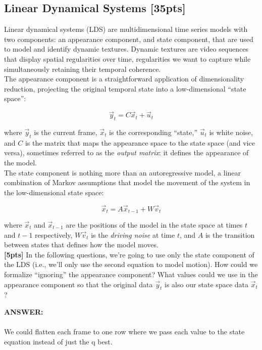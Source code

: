 \documentclass[paper=a4, fontsize=11pt]{scrartcl} %
\numberwithin{figure}{section} %
\numberwithin{table}{section} %
\begin{document}
\subsection{Linear Dynamical Systems \textbf{[35pts]}}

Linear dynamical systems (LDS) are multidimensional time series models with two components: an appearance component, and state component, that are used to model and identify dynamic textures. Dynamic textures are video sequences that display spatial regularities over time, regularities we want to capture while simultaneously retaining their temporal coherence. \\

The appearance component is a straightforward application of dimensionality reduction, projecting the original temporal state into a low-dimensional ``state space'':

$$
\vec{y}_t = C\vec{x}_t + \vec{u}_t
$$

where $\vec{y}_t$ is the current frame, $\vec{x}_t$ is the corresponding ``state,'' $\vec{u}_t$ is white noise, and $C$ is the matrix that maps the appearance space to the state space (and vice versa), sometimes referred to as the \emph{output matrix}: it defines the appearance of the model. \\

The state component is nothing more than an autoregressive model, a linear combination of Markov assumptions that model the movement of the system in the low-dimensional state space:

$$
\vec{x}_t = A\vec{x}_{t - 1} + W\vec{v}_t
$$

where $\vec{x}_t$ and $\vec{x}_{t - 1}$ are the positions of the model in the state space at times $t$ and $t - 1$ respectively, $W\vec{v}_t$ is the \emph{driving noise} at time $t$, and $A$ is the transition between states that defines how the model moves. \\

\textbf{[5pts]} In the following questions, we're going to use only the state component of the LDS (i.e., we'll only use the second equation to model motion). How could we formalize ``ignoring'' the appearance component? What values could we use in the appearance component so that the original data $\vec{y}_t$ is also our state space data $\vec{x}_t$? \\

\begin{addmargin}[2em]{2em}%
  \textbf{ANSWER:}\\\\
  We could flatten each frame to one row where we pass each value to the state equation instead of just the q best.
  \\

\end{addmargin}
\end{document}
